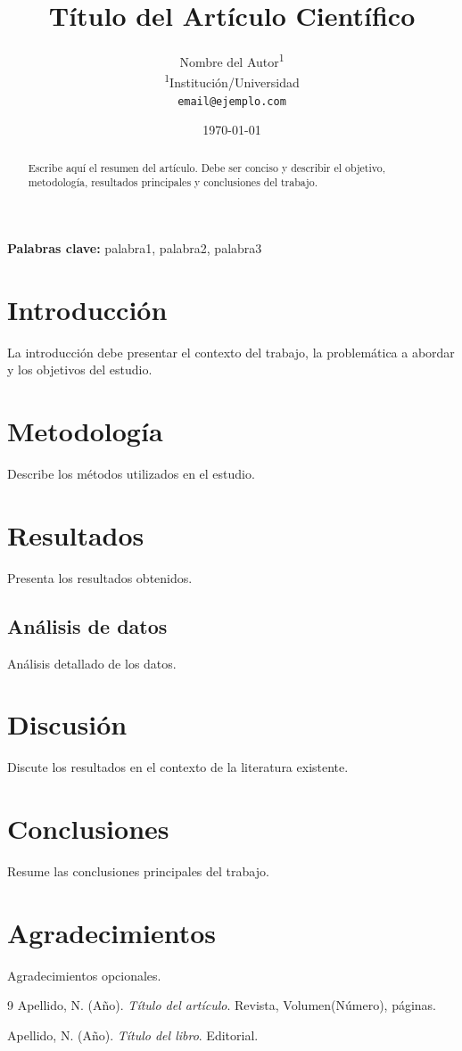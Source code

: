 \documentclass[12pt, a4paper, twocolumn]{article}
\title{\textbf{Título del Artículo Científico}}
\author{
    Nombre del Autor\textsuperscript{1} \\
    \small \textsuperscript{1}Institución/Universidad \\
    \small \texttt{email@ejemplo.com}
}
\date{\today}
\begin{document}
\maketitle

\begin{abstract}
Escribe aquí el resumen del artículo. Debe ser conciso y describir el objetivo, metodología, resultados principales y conclusiones del trabajo.
\end{abstract}

\textbf{Palabras clave:} palabra1, palabra2, palabra3

\section{Introducción}

La introducción debe presentar el contexto del trabajo, la problemática a abordar y los objetivos del estudio.

\section{Metodología}

Describe los métodos utilizados en el estudio.

\section{Resultados}

Presenta los resultados obtenidos.

\subsection{Análisis de datos}

Análisis detallado de los datos.

\section{Discusión}

Discute los resultados en el contexto de la literatura existente.

\section{Conclusiones}

Resume las conclusiones principales del trabajo.

\section*{Agradecimientos}

Agradecimientos opcionales.

\begin{thebibliography}{9}
Apellido, N. (Año). \textit{Título del artículo}. Revista, Volumen(Número), páginas.

Apellido, N. (Año). \textit{Título del libro}. Editorial.
\end{thebibliography}
\end{document}
